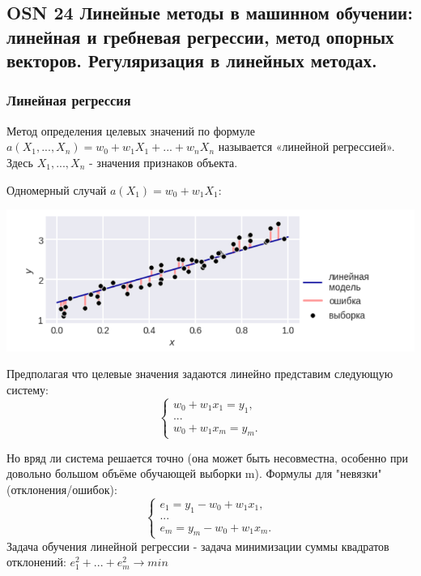 \subsection*{OSN 24 Линейные методы в машинном обучении: линейная и гребневая регрессии, метод опорных векторов. Регуляризация в линейных методах.}

\subsubsection{Линейная регрессия}
Метод определения целевых значений по формуле $a(X_1, ..., X_n) = w_0 + w_1X_1 + ... + w_nX_n$ называется «линейной регрессией». Здесь $X_1, ..., X_n$ - значения признаков объекта.

Одномерный случай $a(X_1) = w_0 + w_1X_1$:

\includegraphics[scale=0.4]{pics/ml2_lin1.png}

Предполагая что целевые значения задаются линейно представим следующую систему:
\begin{equation*}
 \begin{cases}
   w_0 + w_1x_1 = y_1,
   \\
   ...
   \\
   w_0 + w_1x_m = y_m.
 \end{cases}
\end{equation*}

Но вряд ли система решается точно (она может быть несовместна, особенно при довольно большом объёме обучающей выборки m).
Формулы для "невязки" (отклонения/ошибок):
\begin{equation*}
 \begin{cases}
   e_1 = y_1 - w_0 + w_1x_1,
   \\
   ...
   \\
   e_m = y_m - w_0 + w_1x_m.
 \end{cases}
\end{equation*}
Задача обучения линейной регрессии - задача минимизации суммы квадратов
отклонений:
$e_1^2 + ... + e_m^2 \rightarrow min$

